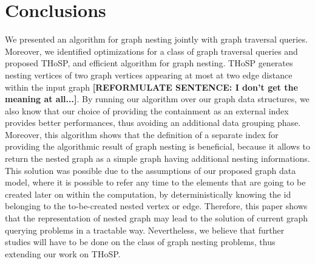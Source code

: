 \section{Conclusions}
We presented an algorithm for graph nesting jointly with graph traversal queries. Moreover, we identified optimizations for a class of graph traversal queries and proposed THoSP, and efficient algorithm for graph nesting. THoSP generates nesting vertices of two graph vertices appearing at most at two edge distance within the input graph \textbf{[REFORMULATE SENTENCE: I don't get the meaning at all...]}. By running our algorithm over our graph data structures, we also know that our choice of providing the containment as an external index provides better performances, thus avoiding an additional data grouping phase. Moreover, this algorithm shows that the definition of a separate index for providing the algorithmic result of graph nesting is beneficial, because it allows to return the nested graph as a simple graph having additional nesting informations. This solution was possible due to the assumptions of our proposed graph data model, where  it is possible to refer any time to the elements that are going to be created later on within the computation, by  deterministically knowing  the id belonging to the to-be-created nested vertex or edge.  Therefore, this paper shows that the representation of nested graph may lead to the solution of current graph querying problems in a tractable way. Nevertheless, we believe that further studies will have to be done on the class of  graph nesting problems, thus extending our work on THoSP.
